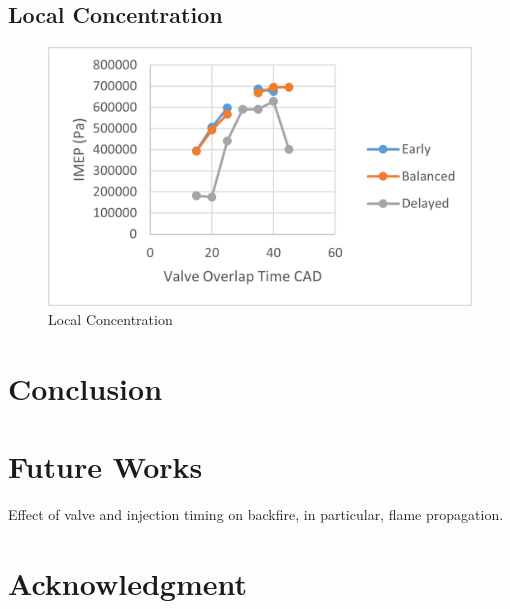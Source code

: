 \documentclass[conference]{IEEEtran}
\begin{document}
\subsection{Local Concentration}
\begin{figure}[htbp]
    \centerline{\includegraphics{Plots/imep.png}}
    \caption{Local Concentration}
    \label{plt_7}
    \end{figure}

\section{Conclusion}

\section{Future Works}
Effect of valve and injection timing on backfire, in particular, flame propagation.

\section*{Acknowledgment}
\end{document}
